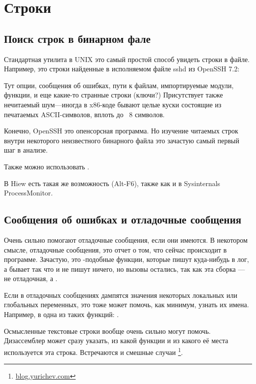 \section{Строки}
\label{sec:digging_strings}



\subsection{Поиск строк в бинарном фале}

Стандартная утилита в UNIX  это самый простой способ увидеть строки в файле.
Например, это строки найденные в исполняемом файле sshd из OpenSSH 7.2:



Тут опции, сообщения об ошибках, пути к файлам, импортируемые модули, функции, и еще какие-то странные строки (ключи?)
Присутствует также нечитаемый шум---иногда в x86-коде бывают целые куски состоящие из печатаемых ASCII-символов,
вплоть до ~8 символов.

Конечно, OpenSSH это опенсорсная программа.
Но изучение читаемых строк внутри некоторого неизвестного бинарного файла это зачастую самый первый шаг в анализе.

Также можно использовать .

В Hiew есть такая же возможность (Alt-F6), также как и в Sysinternals ProcessMonitor.

\subsection{Сообщения об ошибках и отладочные сообщения}

Очень сильно помогают отладочные сообщения, если они имеются. В некотором смысле, отладочные сообщения, 
это отчет о том, что сейчас происходит в программе.
Зачастую, это \printf-подобные функции, 
которые пишут куда-нибудь в лог, а бывает так что и не пишут ничего, но вызовы остались, так как эта сборка --- не
отладочная, а .

\myindex{\oracle}
Если в отладочных сообщениях дампятся значения некоторых локальных или глобальных переменных, 
это тоже может помочь, как минимум, узнать их имена. 
Например, в \oracle одна из таких функций: .

Осмысленные текстовые строки вообще очень сильно могут помочь. 
Дизассемблер \IDA может сразу указать, из какой функции и из какого её места используется эта строка. 
Встречаются и смешные случаи
\footnote{\href{http://go.yurichev.com/17223}{blog.yurichev.com}}.

